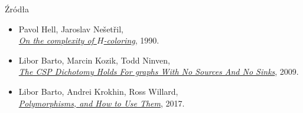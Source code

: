 \begin{frame}{Źródła}

\begin{itemize}
    \item Pavol Hell, Jaroslav Ne\v{s}et\v{r}il,\\
    \href{https://www.sciencedirect.com/science/article/pii/009589569090132J?ref=pdf_download&fr=RR-2&rr=9e2d9d2f8f56a48f}{\textit{On the complexity of \(H\)-coloring}}, 1990.
    
    \item Libor Barto, Marcin Kozik, Todd Ninven,\\
    \href{https://www.karlin.mff.cuni.cz/~barto/Articles/CSPSmooth.pdf}{\textit{The CSP Dichotomy Holds For graphs With No Sources And No Sinks}}, 2009.
    
    \item Libor Barto, Andrei Krokhin, Ross Willard,\\
    \href{https://drops.dagstuhl.de/storage/02dagstuhl-follow-ups/dfu-vol007/DFU.Vol7.15301.1/DFU.Vol7.15301.1.pdf}{\textit{Polymorphisms, and How to Use Them}}, 2017.
\end{itemize}

\end{frame}